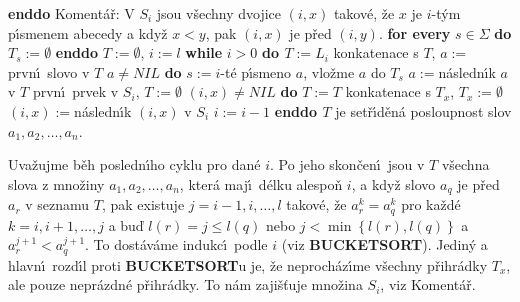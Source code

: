{\bf enddo\newline}
Koment\'a\v r: V $S_i$ jsou v\v sechny dvojice $\left(i,x\right)$ takov\'e, \v ze $x$ 
je $i$-t\'ym p\'\i smenem abecedy a kdy\v z $x<y$, pak $\left(i,x\right)$ je 
p\v red $\left(i,y\right)$.\newline 
{\bf for every} $s\in\Sigma$ {\bf do} $T_s:=\emptyset$ {\bf enddo}\newline 
$T:=\emptyset$, $i:=l$\newline 
{\bf while} $i>0$ {\bf do\newline 
\phantom{---}$T:=L_i$} konkatenace s $T$, $a:=$prvn\'\i\ slovo v $T$\newline 
\phantom{---}{\bf while} $a\ne NIL$ {\bf do}\newline 
\phantom{------}$s:=i$-t\'e p\'\i smeno $a$, vlo\v zme $a$ do $T_s$\newline 
\phantom{------}$a:=$n\'asledn\'\i k $a$ v $T$\newline 
{}prvn\'\i\ prvek v $S_i$, $T:=\emptyset$\newline 
\phantom{---}{\bf while} $\left(i,x\right)\ne NIL$ {\bf do}\newline 
\phantom{------}$T:=T$ konkatenace s $T_x$, $T_x:=\emptyset$\newline 
\phantom{------}$\left(i,x\right):=$n\'asledn\'\i k $\left(i,x\right)$ v $S_i$\newline 
\phantom{---}{\bf enddo}\newline
\phantom{---}$i:=i-1$\newline 
{\bf enddo\newline 
$T$} je set\v r\'\i d\v en\'a posloupnost slov $a_1,a_2,\dots,a_n$.
\bigskip

\flushpar Uva\v zujme b\v eh posledn\'\i ho cyklu pro dan\'e $i$. Po 
jeho skon\v cen\'\i\ jsou v $T$ v\v sechna slova z mno\v ziny 
$a_1,a_2,\dots,a_n$, kter\'a maj\'\i\ d\'elku alespo\v n $i$, a kdy\v z slovo 
$a_q$ je p\v red $a_r$ v seznamu $T$, pak existuje $j=i-1,i,\dots
,l$
takov\'e, \v ze $a^k_r=a^k_q$ pro ka\v zd\'e $k=i,i+1,\dots,j$ a bu\v d 
$l\left(r\right)=j\le l\left(q\right)$ nebo $j<\min\left\{l\left(r\right),l\left(q\right)\right\}$ a $a_r^{j+1}<a_q^{j+1}$. To 
dost\'av\'ame indukc\'\i\ podle $i$ (viz {\bf BUCKETSORT}). Jedin\'y a 
hlavn\'\i\ rozd\'\i l proti {\bf BUCKETSORT}u je, \v ze neproch\'az\'\i me 
v\v sechny p\v rihr\'adky $T_x$, ale pouze nepr\'azdn\'e p\v rihr\'adky. 
To n\'am zaji\v s\v tuje mno\v zina $S_i$, viz Koment\'a\v r. 
\medskip

